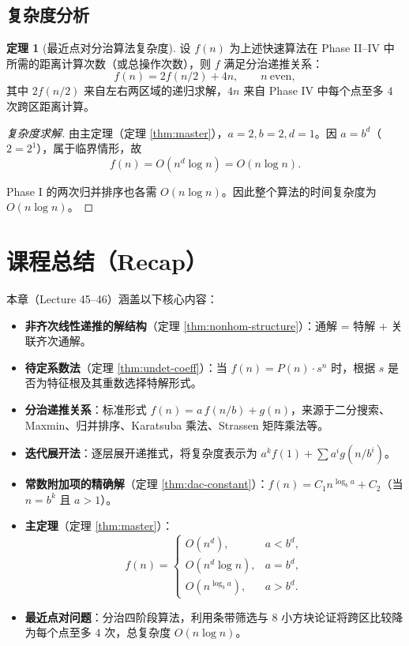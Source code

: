 \documentclass[UTF8,11pt,a4paper]{ctexbook}   %
\theoremstyle{definition}
\newtheorem{theorem}{定理}[section]
\begin{document}
\subsection{复杂度分析}

\begin{theorem}[最近点对分治算法复杂度]
设 $f(n)$ 为上述快速算法在 Phase II--IV 中所需的距离计算次数（或总操作次数），则 $f$ 满足分治递推关系：
\[
f(n) = 2f(n/2) + 4n,\qquad n\ \text{even},
\]
其中 $2f(n/2)$ 来自左右两区域的递归求解，$4n$ 来自 Phase IV 中每个点至多 $4$ 次跨区距离计算。
\end{theorem}

\begin{proof}[复杂度求解]
由主定理（定理 \ref{thm:master}），$a=2,b=2,d=1$。因 $a=b^d$（$2=2^1$），属于临界情形，故
\[
f(n) = O(n^d\log n) = O(n\log n).
\]

Phase I 的两次归并排序也各需 $O(n\log n)$。因此整个算法的时间复杂度为 $O(n\log n)$。
\end{proof}

\section*{课程总结（Recap）}

本章（Lecture 45--46）涵盖以下核心内容：

\begin{itemize}
    \item \textbf{非齐次线性递推的解结构}（定理 \ref{thm:nonhom-structure}）：通解 = 特解 + 关联齐次通解。
    \item \textbf{待定系数法}（定理 \ref{thm:undet-coeff}）：当 $f(n)=P(n)\cdot s^n$ 时，根据 $s$ 是否为特征根及其重数选择特解形式。
    \item \textbf{分治递推关系}：标准形式 $f(n)=a\,f(n/b)+g(n)$，来源于二分搜索、Maxmin、归并排序、Karatsuba 乘法、Strassen 矩阵乘法等。
    \item \textbf{迭代展开法}：逐层展开递推式，将复杂度表示为 $a^k f(1)+\sum a^i g(n/b^i)$。
    \item \textbf{常数附加项的精确解}（定理 \ref{thm:dac-constant}）：$f(n)=C_1 n^{\log_b a}+C_2$（当 $n=b^k$ 且 $a>1$）。
    \item \textbf{主定理}（定理 \ref{thm:master}）：
    \[
    f(n)=
    \begin{cases}
    O(n^d), & a<b^d,\\[0.3em]
    O(n^d\log n), & a=b^d,\\[0.3em]
    O(n^{\log_b a}), & a>b^d.
    \end{cases}
    \]
    \item \textbf{最近点对问题}：分治四阶段算法，利用条带筛选与 $8$ 小方块论证将跨区比较降为每个点至多 $4$ 次，总复杂度 $O(n\log n)$。
\end{itemize}
\end{document}
